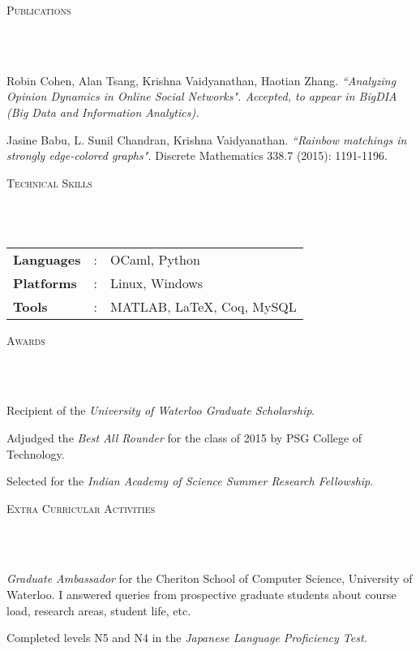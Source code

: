 \documentclass{article}
\newcommand{\header}[1]{{
\hspace*{-15pt}\vspace*{6pt} \textsc{#1}} \vspace*{-6pt} 
\lineunder
}
\newcommand{\lineunder}{
\vspace*{-8pt} \\ \hspace*{-18pt} 
\hrulefill \\
}
\renewcommand{\labelitemii}{
$\vcenter{\hbox{\tiny$\bullet$}}$\hspace*{-3pt}
}
\newenvironment{bullet-list-major}{
\begin{list}{\labelitemii}{\setlength\leftmargin{3pt} 
\topsep 0pt \itemsep -2pt}}{\vspace*{4pt}\end{list}
}
\begin{document}
\vspace*{4pt}%
\header{Publications}
\begin{bullet-list-major}
\item Robin Cohen, Alan Tsang, Krishna Vaidyanathan, Haotian Zhang. 
    \textit{``Analyzing Opinion Dynamics in Online Social Networks". Accepted, to appear in 
        BigDIA (Big Data and Information Analytics).} 
\item Jasine  Babu,  L.  Sunil  Chandran, Krishna  Vaidyanathan.
    \textit{``Rainbow matchings in strongly edge-colored graphs".} Discrete Mathematics 338.7 (2015):  1191-1196.
\end{bullet-list-major}

\vspace*{4pt}%
\header{Technical Skills}
\begin{tabular}{l l l}

\textbf{Languages}&: & OCaml, Python \\
\textbf{Platforms}&:  & Linux, Windows\\
\textbf{Tools}&:     &MATLAB, \LaTeX, Coq, MySQL
\end{tabular}


\vspace*{4pt}%
\header{Awards}
    \begin{bullet-list-major}
    \item Recipient of the \textit{University of Waterloo Graduate Scholarship}.
    \item Adjudged the \textit{Best All Rounder} for the class of 2015 by PSG College of
        Technology. 
    \item Selected for the \textit{Indian Academy of Science Summer Research
            Fellowship}.
    \end{bullet-list-major}

\vspace*{4pt}%
\header{Extra Curricular Activities}
    \begin{bullet-list-major}
    \item \textit{Graduate Ambassador} for the Cheriton School of Computer Science,
        University of Waterloo. I answered queries from prospective graduate
        students about course load, research areas, student life, etc.
    \item Completed levels N5 and N4 in the \textit{Japanese Language
            Proficiency Test}.
    \end{bullet-list-major}
\end{document}
